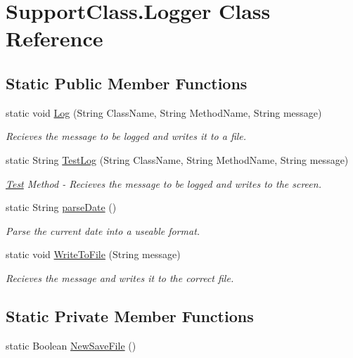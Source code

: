 \hypertarget{class_support_class_1_1_logger}{}\section{Support\+Class.\+Logger Class Reference}
\label{class_support_class_1_1_logger}
\subsection*{Static Public Member Functions}
\begin{DoxyCompactItemize}
\item 
static void \hyperlink{class_support_class_1_1_logger_acaf12b0f7239d3de56b5026e701beb5d}{Log} (String Class\+Name, String Method\+Name, String message)
\begin{DoxyCompactList}\small\item\em Recieves the message to be logged and writes it to a file. \end{DoxyCompactList}\item 
static String \hyperlink{class_support_class_1_1_logger_a8752b9010ef83fa4cdaed9e4a0506f66}{Test\+Log} (String Class\+Name, String Method\+Name, String message)
\begin{DoxyCompactList}\small\item\em \hyperlink{namespace_test}{Test} Method -\/ Recieves the message to be logged and writes to the screen. \end{DoxyCompactList}\item 
static String \hyperlink{class_support_class_1_1_logger_a9e8ce97e4c74c410c67d04a64b62329b}{parse\+Date} ()
\begin{DoxyCompactList}\small\item\em Parse the current date into a useable format. \end{DoxyCompactList}\item 
static void \hyperlink{class_support_class_1_1_logger_abcf43ef5cf707175d4a3a831b83efffb}{Write\+To\+File} (String message)
\begin{DoxyCompactList}\small\item\em Recieves the message and writes it to the correct file. \end{DoxyCompactList}\end{DoxyCompactItemize}
\subsection*{Static Private Member Functions}
\begin{DoxyCompactItemize}
\item 
static Boolean \hyperlink{class_support_class_1_1_logger_a97bd9efcc6aa603244e8cde6f3703ce8}{New\+Save\+File} ()
\end{DoxyCompactItemize}


